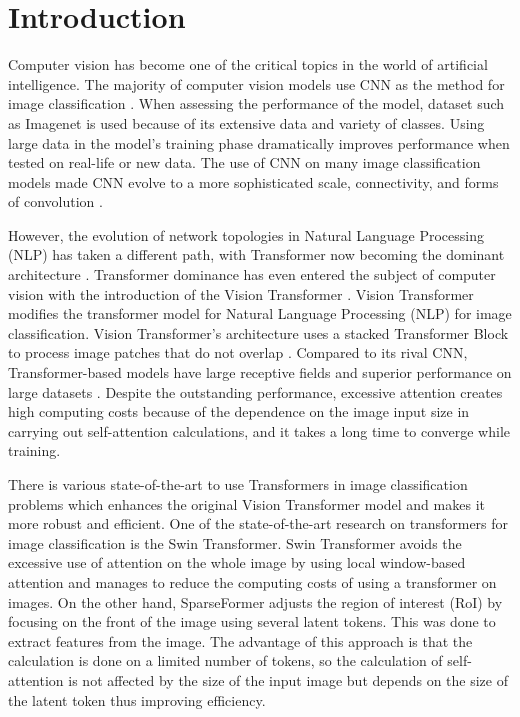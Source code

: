 \documentclass[runningheads]{llncs}
\begin{document}
\section{Introduction}
\label{sec:introduction}
Computer vision has become one of the critical topics in the world of artificial intelligence. The majority of computer vision models use CNN as the method for image classification \cite{NIPS2012_c399862d, Simonyan15, DBLP:journals/corr/HeZRS15, DBLP:journals/corr/SzegedyLJSRAEVR14, DBLP:journals/corr/HowardZCKWWAA17, DBLP:journals/corr/SzegedyVISW15, DBLP:journals/corr/HuangLW16a, DBLP:journals/corr/abs-1905-11946}. When assessing the performance of the model, dataset such as Imagenet \cite{deng2009imagenet} is used because of its extensive data and variety of classes. Using large data in the model’s training phase dramatically improves performance when tested on real-life or new data. The use of CNN on many image classification models made CNN evolve to a more sophisticated scale, connectivity, and forms of convolution \cite{chen2021review}.

However, the evolution of network topologies in Natural Language Processing (NLP) has taken a different path, with Transformer now becoming the dominant architecture \cite{vaswani2017attention}. Transformer dominance has even entered the subject of computer vision with the introduction of the Vision Transformer \cite{dosovitskiy2020image}. Vision Transformer modifies the transformer model for Natural Language Processing (NLP) for image classification. Vision Transformer’s architecture uses a stacked Transformer Block to process image patches that do not overlap \cite{zhang2023vision}. Compared to its rival CNN, Transformer-based models have large receptive fields \cite{cheng2023hybrid} and superior performance on large datasets \cite{liu2021swin}. Despite the outstanding performance, excessive attention creates high computing costs because of the dependence on the image input size in carrying out self-attention calculations, and it takes a long time to converge while training.

There is various state-of-the-art to use Transformers in image classification problems which enhances the original Vision Transformer model and makes it more robust and efficient. One of the state-of-the-art research on transformers for image classification is the Swin Transformer. Swin Transformer avoids the excessive use of attention on the whole image by using local window-based attention \cite{liu2021swin} and manages to reduce the computing costs of using a transformer on images. On the other hand, SparseFormer \cite{gao2023sparseformer} adjusts the region of interest (RoI) by focusing on the front of the image using several latent tokens. This was done to extract features from the image. The advantage of this approach is that the calculation is done on a limited number of tokens, so the calculation of self-attention is not affected by the size of the input image but depends on the size of the latent token thus improving efficiency.
\end{document}
